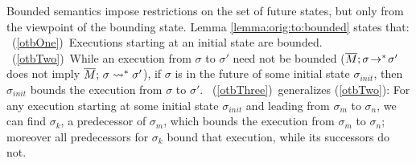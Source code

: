 Bounded semantics impose restrictions on the set of future states, but only from the viewpoint of {the bounding}  state. 
Lemma \ref{lemma:orig:to:bounded}  states that:  
\ (\ref{otbOne})\  Executions starting at an initial state  are bounded.
\ (\ref{otbTwo})\  {While an execution from $\sigma$ to $\sigma'$ need not be bounded ($\overline{M};\sigma\! \rightarrow^*\! {\sigma'}$ does not imply $ \overline{M};\, {\sigma} \rightsquigarrow^* \sigma'$), if $\sigma$ is in the future of some initial state $\sigma_{init}$, 
 then $\sigma_{init}$  bounds the execution from $\sigma$ to   $\sigma'$. }
 \ (\ref{otbThree})\  generalizes %
 (\ref{otbTwo}): {For any execution starting at some initial state $\sigma_{init}$ and leading from $\sigma_m$ to $\sigma_n$, 
 we can find $\sigma_k$, a predecessor of $\sigma_m$, which  bounds the execution from $\sigma_m$ to $\sigma_n$; moreover all
  predecessors  for $\sigma_k$ bound that execution, while its successors do not.}

